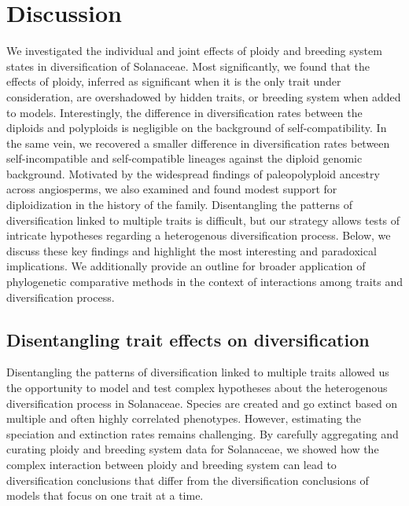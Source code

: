 \section{Discussion}

We investigated the individual and joint effects of ploidy and breeding system states in diversification of Solanaceae.
Most significantly, we found that the effects of ploidy, inferred as significant when it is the only trait under consideration, are overshadowed by hidden traits, or breeding system when added to models.  
Interestingly, the difference in diversification rates between the diploids and polyploids is negligible on the background of self-compatibility.
In the same vein, we recovered a smaller difference in diversification rates between self-incompatible and self-compatible lineages against the diploid genomic background.
Motivated by the widespread findings of paleopolyploid ancestry across angiosperms, we also examined and found modest support for diploidization in the history of the family. %
Disentangling the patterns of diversification linked to multiple traits is difficult, but our strategy allows tests of intricate hypotheses regarding a heterogenous diversification process.
Below, we discuss these key findings and highlight the most interesting and paradoxical implications.
We additionally provide an outline for broader application of phylogenetic comparative methods in the context of interactions among traits and diversification process. 

\subsection*{Disentangling trait effects on diversification}


Disentangling the patterns of diversification linked to  multiple traits allowed us the opportunity to model and test complex hypotheses about the heterogenous diversification process in Solanaceae.
Species are created and go extinct based on multiple and often highly correlated phenotypes. 
However, estimating the speciation and extinction rates remains challenging. 
By carefully aggregating and curating ploidy and breeding system data for Solanaceae, we showed how  the complex interaction between ploidy and breeding system  can lead to diversification conclusions that differ from the diversification conclusions of models that focus on one trait at a time.

